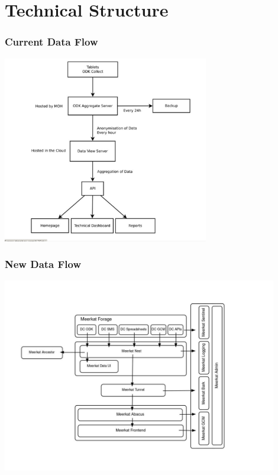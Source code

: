 \documentclass{beamer}
\begin{document}
\section{Technical Structure}
\begin{frame}
  \frametitle{Current Data Flow}
  \begin{center}
    \includegraphics[width=9cm]{data_flow.png}
  \end{center}
\end{frame}

\begin{frame}
  \frametitle{New Data Flow}
  \begin{center}
    \includegraphics[width=12cm]{data_flow_new.jpg}
  \end{center}
\end{frame}
\end{document}
